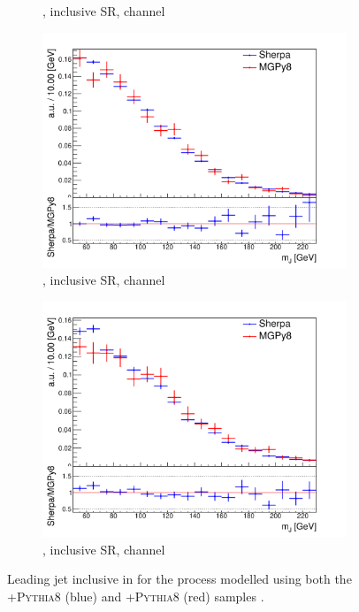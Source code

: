 \begin{figure}[!htbp]
\begin{subfigure}{.5\textwidth}
    \caption{\Whf, \pTV inclusive SR, \olep channel}
    \label{fig:Vjets_MGSherpa_inc_sub2}
  \end{subfigure}
  \begin{subfigure}{.5\textwidth}
    \includegraphics[width=\textwidth]{chapters/6.vhbb_boosted/figs/0L_Zhf_2tag1pfat0pjet_ptvinc_SR_noaddbjetsr_mJIncl.pdf}
    \caption{\Zhf, \pTV inclusive SR, \zlep channel}
    \label{fig:Vjets_MGSherpa_inc_sub3}
  \end{subfigure}%
  \hfill
  \begin{subfigure}{.5\textwidth}
    \includegraphics[width=\textwidth]{chapters/6.vhbb_boosted/figs/2L_Zhf_2tag1pfat0pjet_ptvinc_SR_mJIncl.pdf}
    \caption{\Zhf, \pTV inclusive SR, \tlep channel}
    \label{fig:Vjets_MGSherpa_inc_sub4}
  \end{subfigure}%
  \hfill
  \caption{Leading \largeR jet \mJ inclusive in \ptv for the \Vhf process modelled using both the \SHERPA+\textsc{Pythia8} (blue) and \MADGRAPH+\textsc{Pythia8} (red) samples \cite{Dao:2688371}.}
  \label{fig:Vjets_MGSherpa_inc}
\end{figure}



